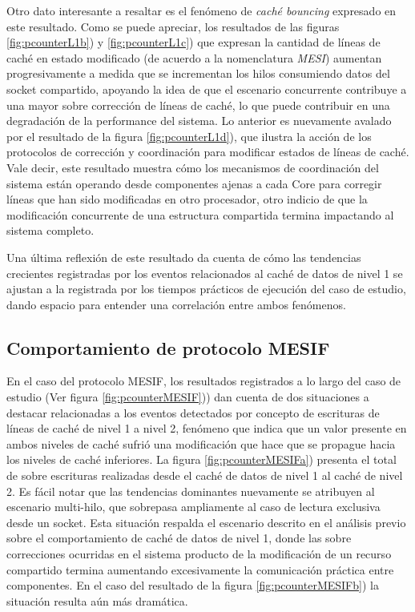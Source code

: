 Otro dato interesante a resaltar es el fenómeno de \emph{caché bouncing} expresado en este resultado. Como se puede apreciar, los resultados de las figuras \ref{fig:pcounterL1b}) y \ref{fig:pcounterL1c}) que expresan la cantidad de líneas de caché en estado modificado (de acuerdo a la nomenclatura \emph{MESI}) aumentan progresivamente a medida que se incrementan los hilos consumiendo datos del socket compartido, apoyando la idea de que el escenario concurrente contribuye a una mayor sobre corrección de líneas de caché, lo que puede contribuir en una degradación de la performance del sistema. Lo anterior es nuevamente avalado por el resultado de la figura \ref{fig:pcounterL1d}), que ilustra la acción de los protocolos de corrección y coordinación para modificar estados de líneas de caché. Vale decir, este resultado muestra cómo los mecanismos de coordinación del sistema están operando desde componentes ajenas a cada Core para corregir líneas que han sido modificadas en otro procesador, otro indicio de que la modificación concurrente de una estructura compartida termina impactando al sistema completo.

Una última reflexión de este resultado da cuenta de cómo las tendencias crecientes registradas por los eventos relacionados al caché de datos de nivel 1 se ajustan a la registrada por los tiempos prácticos de ejecución del caso de estudio, dando espacio para entender una correlación entre ambos fenómenos.

\subsection{Comportamiento de protocolo MESIF}
En el caso del protocolo MESIF, los resultados registrados a lo largo del caso de estudio (Ver figura \ref{fig:pcounterMESIF})) dan cuenta de dos situaciones a destacar relacionadas a los eventos detectados por concepto de escrituras de líneas de caché de nivel 1 a nivel 2, fenómeno que indica que un valor presente en ambos niveles de caché sufrió una modificación que hace que se propague hacia los niveles de caché inferiores.
La figura \ref{fig:pcounterMESIFa}) presenta el total de sobre escrituras realizadas desde el caché de datos de nivel 1 al caché de nivel 2. Es fácil notar que las tendencias dominantes nuevamente se atribuyen al escenario multi-hilo, que sobrepasa ampliamente al caso de lectura exclusiva desde un socket. Esta situación respalda el escenario descrito en el análisis previo sobre el comportamiento de caché de datos de nivel 1, donde las sobre correcciones ocurridas en el sistema producto de la modificación de un recurso compartido termina aumentando excesivamente la comunicación práctica entre componentes. En el caso del resultado de la figura \ref{fig:pcounterMESIFb}) la situación resulta aún más dramática. 

